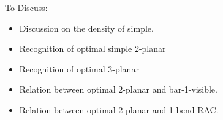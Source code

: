 \documentclass[a4paper,UKenglish]{lipics-v2016}
\theoremstyle{plain}
\begin{document}
To Discuss:

\begin{itemize}
  \item Discussion on the density of simple.
  \item Recognition of optimal simple 2-planar
  \item Recognition of optimal 3-planar
  \item Relation between optimal 2-planar and bar-1-visible.
  \item Relation between optimal 2-planar and 1-bend RAC.
\end{itemize}



\end{document}
